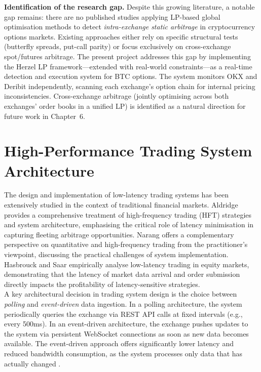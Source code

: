 \documentclass[openany]{book}
\numberwithin{figure}{chapter}
\numberwithin{equation}{chapter}
\begin{document}
\textbf{Identification of the research gap.} Despite this growing literature, a notable gap remains: there are no published studies applying LP-based global optimisation methods to detect \textit{intra-exchange static arbitrage} in cryptocurrency options markets. Existing approaches either rely on specific structural tests (butterfly spreads, put-call parity) or focus exclusively on cross-exchange spot/futures arbitrage. The present project addresses this gap by implementing the Herzel \cite{herzel2005} LP framework---extended with real-world constraints---as a real-time detection and execution system for BTC options. The system monitors OKX and Deribit independently, scanning each exchange's option chain for internal pricing inconsistencies. Cross-exchange arbitrage (jointly optimising across both exchanges' order books in a unified LP) is identified as a natural direction for future work in Chapter~6.

\section{High-Performance Trading System Architecture}

The design and implementation of low-latency trading systems has been extensively studied in the context of traditional financial markets. Aldridge \cite{aldridge2013} provides a comprehensive treatment of high-frequency trading (HFT) strategies and system architecture, emphasising the critical role of latency minimisation in capturing fleeting arbitrage opportunities. Narang \cite{narang2013} offers a complementary perspective on quantitative and high-frequency trading from the practitioner's viewpoint, discussing the practical challenges of system implementation. Hasbrouck and Saar \cite{hasbrouck2013} empirically analyse low-latency trading in equity markets, demonstrating that the latency of market data arrival and order submission directly impacts the profitability of latency-sensitive strategies.\\

A key architectural decision in trading system design is the choice between \textit{polling} and \textit{event-driven} data ingestion. In a polling architecture, the system periodically queries the exchange via REST API calls at fixed intervals (e.g., every 500ms). In an event-driven architecture, the exchange pushes updates to the system via persistent WebSocket connections as soon as new data becomes available. The event-driven approach offers significantly lower latency and reduced bandwidth consumption, as the system processes only data that has actually changed \cite{aldridge2013}.\\
\end{document}
